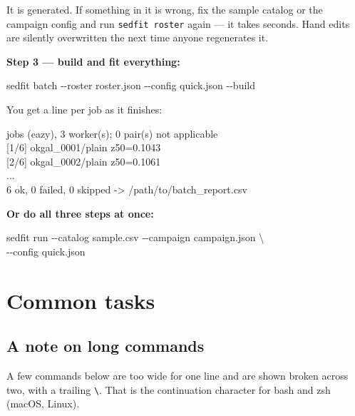 \documentclass[11pt]{article}
\begin{document}
\begin{warnbox}
It is generated. If something in it is wrong, fix the sample catalog or
the campaign config and run \texttt{sedfit roster} again --- it takes
seconds. Hand edits are silently overwritten the next time anyone
regenerates it.
\end{warnbox}

\textbf{Step 3 --- build and fit everything:}

\begin{cmd}\ttfamily
sedfit batch -{}-roster roster.json -{}-config quick.json -{}-build
\end{cmd}

You get a line per job as it finishes:

\begin{cmd} jobs (eazy), 3 worker(s); 0 pair(s) not applicable\\
{[1/6]} ok\hspace*{6em}gal\_0001/plain z50=0.1043\\
{[2/6]} ok\hspace*{6em}gal\_0002/plain z50=0.1061\\
...\\
6 ok, 0 failed, 0 skipped -> /path/to/batch\_report.csv
\end{cmd}

\textbf{Or do all three steps at once:}

\begin{cmd}\ttfamily
sedfit run -{}-catalog sample.csv -{}-campaign campaign.json \textbackslash\\
\hspace*{4em}-{}-config quick.json
\end{cmd}

\section{Common tasks}

\subsection{A note on long commands}

A few commands below are too wide for one line and are shown broken
across two, with a trailing \texttt{\textbackslash}. That is the
continuation character for bash and zsh (macOS, Linux).
\end{document}
